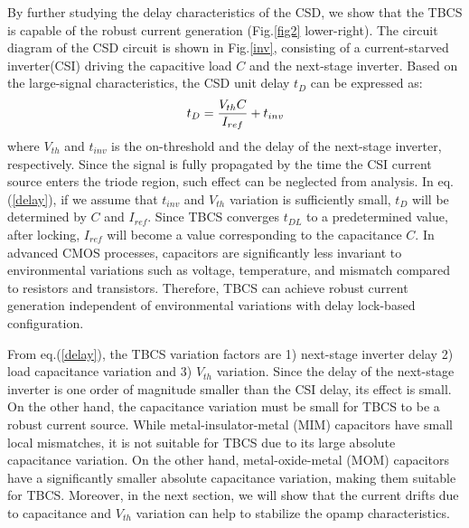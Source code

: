 \documentclass[paper]{ieice}
\begin{document}
By further studying the delay characteristics of the CSD, we show that the TBCS is capable of the robust current generation (Fig.\ref{fig2} lower-right).
The circuit diagram of the CSD circuit is shown in Fig.\ref{inv}, consisting of a current-starved inverter(CSI)\cite{mroszczyk2014tunable} driving the capacitive load $C$ and the next-stage inverter. Based on the large-signal characteristics, the CSD unit delay $t_D$ can be expressed as: 
\begin{eqnarray}
    \centering
    t_D = \frac{V_{th}C}{I_{ref}}+t_{inv}
    \label{delay}
\end{eqnarray}
where $V_{th}$ and $t_{inv}$ is the on-threshold and the delay of the next-stage inverter, respectively.  Since the signal is fully propagated by the time the CSI current source enters the triode region, such effect can be neglected from analysis. In eq.(\ref{delay}), if we assume that $t_{inv}$ and $V_{th}$ variation is sufficiently small, $t_D$ will be determined by $C$ and $I_{ref}$. 
Since TBCS converges $t_{DL}$ to a predetermined value, after locking, $I_{ref}$ will become a value corresponding to the capacitance $C$. In advanced CMOS processes, capacitors are significantly less invariant to environmental variations such as voltage, temperature, and mismatch compared to resistors and transistors. Therefore, TBCS can achieve robust current generation independent of environmental variations with delay lock-based configuration.

From eq.(\ref{delay}), the TBCS variation factors are 1) next-stage inverter delay 2) load capacitance variation and 3) $V_{th}$ variation.
Since the delay of the next-stage inverter is one order of magnitude smaller than the CSI delay, its effect is small. On the other hand, the capacitance variation must be small for TBCS to be a robust current source. While metal-insulator-metal (MIM) capacitors have small local mismatches, it is not suitable for TBCS due to its large absolute capacitance variation. On the other hand, metal-oxide-metal (MOM) capacitors have a significantly smaller absolute capacitance variation, making them suitable for TBCS. Moreover, in the next section, we will show that the current drifts due to capacitance and $V_{th}$ variation can help to stabilize the opamp characteristics.
\end{document}
